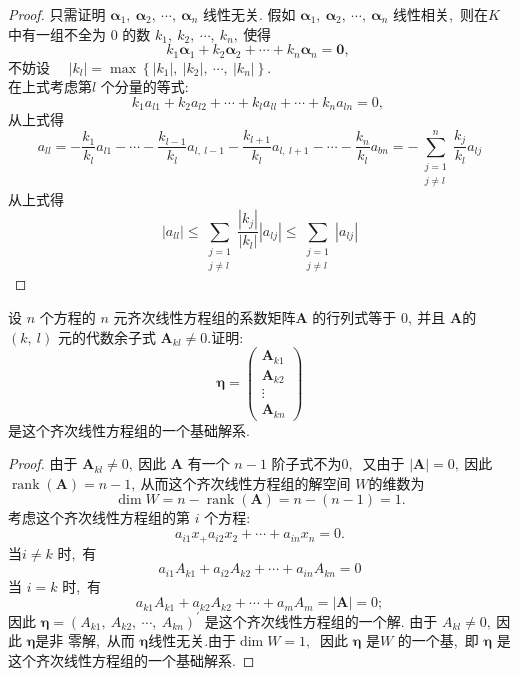 \begin{proof}
	只需证明  $\boldsymbol{\alpha}_{1},\  \boldsymbol{\alpha}_{2},\  \cdots,\  \boldsymbol{\alpha}_{n}$  线性无关.
	假如  $\boldsymbol{\alpha}_{1},\  \boldsymbol{\alpha}_{2},\  \cdots,\  \boldsymbol{\alpha}_{n} $ 线性相关,\  则在$  K$  中有一组不全为 $0$ 的数  $k_{1},\  k_{2},\  \cdots,\  k_{n} ,\  $使得
	$$k_{1} \boldsymbol{\alpha}_{1}+k_{2} \boldsymbol{\alpha}_{2}+\cdots+k_{n} \boldsymbol{\alpha}_{n}=\mathbf{0},\ $$
	不妨设  $\quad\left|k_{l}\right|=\max \left\{\left|k_{1}\right|,\ \left|k_{2}\right|,\  \cdots,\ \left|k_{n}\right|\right\}.$\\
	在上式考虑第$  l $ 个分量的等式:
	$$k_{1} a_{l 1}+k_{2} a_{l 2}+\cdots+k_{l} a_{ll}+\cdots+k_{n} a_{l n}=0,\ $$
	从上式得
	$$a_{l l}=-\frac{k_{1}}{k_{l}} a_{l 1}-\cdots-\frac{k_{l-1}}{k_{l}} a_{l,\  l-1}-\frac{k_{l+1}}{k_{l}} a_{l,\  l+1}-\cdots-\frac{k_{n}}{k_{l}} a_{b n}=-\sum_{\substack{j=1 \\ j \neq l}}^{n}\frac{k_j}{k_l}a_{lj}$$
	从上式得
	$$|a_{ll}|\leqslant\sum_{\substack{j=1 \\ j \neq l}}\frac{|k_j|}{|k_l|}|a_{lj}|\leqslant\sum_{\substack{j=1 \\ j \neq l}}|a_{lj}|$$
\end{proof}
\newpage
\begin{problem}
	设  $n$  个方程的 $ n $ 元齐次线性方程组的系数矩阵$  \boldsymbol{A} $ 的行列式等于 $0 ,\  $并且 $ \boldsymbol{A}  $的  $(k,\  l) $ 元的代数余子式  $\boldsymbol{A}_{k l} \neq 0 .$证明:
	$$\boldsymbol{\eta}=\left(\begin{array}{c}
		\boldsymbol{A}_{k 1} \\
		\boldsymbol{A}_{k 2} \\
		\vdots \\
		\boldsymbol{A}_{k n}
	\end{array}\right)$$
	是这个齐次线性方程组的一个基础解系.
\end{problem}
\begin{proof}
	由于  $\boldsymbol{A}_{k l} \neq 0 ,\  $因此  $\boldsymbol{A} $ 有一个  $n-1$  阶子式不为$ 0,\ $ 又由于 $ |\boldsymbol{A}|=0 ,\  $因此  $\operatorname{rank}(\boldsymbol{A})=   n-1 ,\ $从而这个齐次线性方程组的解空间 $ W  $的维数为
	$$\operatorname{dim}W=n-\operatorname{rank}(\boldsymbol{A})=n-(n-1)=1.$$
	考虑这个齐次线性方程组的第  $i $ 个方程:
	$$a_{i1}x_+a_{i2}x_2+\cdots+a_{in}x_n=0.$$
	当$  i \neq k$  时,\ 有
	$$a_{i 1} A_{k 1}+a_{i 2} A_{k 2}+\cdots+a_{in} A_{kn}=0 $$
	当 $ i=k$ 时,\  有 
	$$ a_{k 1} A_{k 1}+a_{k 2} A_{k 2}+\cdots+a_{m} A_{m}=|\boldsymbol{A}|=0 ; $$
	因此 $ \boldsymbol{\eta}=\left(A_{k1},\  A_{k 2},\  \cdots,\  A_{kn}\right)^{\prime} $ 是这个齐次线性方程组的一个解.
	由于 $ A_{kl} \neq 0 ,\  $因此 $ \boldsymbol{\eta}  $是非 零解,\  从而 $ \boldsymbol{\eta}  $线性无关.由于$  \operatorname{dim} W=1 ,\  $
	因此  $\boldsymbol{\eta}$  是$  W$  的一个基,\  即 $ \boldsymbol{\eta}$  是这个齐次线性方程组的一个基础解系.
\end{proof}
